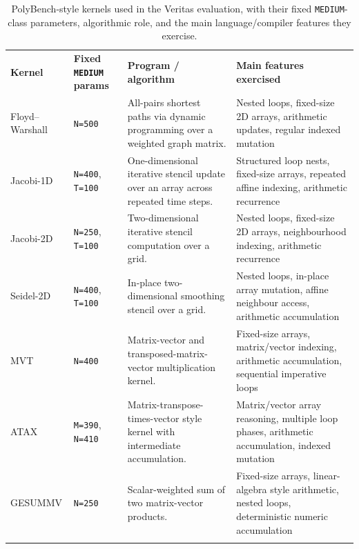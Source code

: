 \begin{table}[h]
  \centering
  \scriptsize
  \begin{tabular}{p{} p{} p{} p{}}
    \tablehline
    \textbf{Kernel} & \textbf{Fixed \texttt{MEDIUM} params} & \textbf{Program / algorithm}                                                       & \textbf{Main features exercised}                                                                     \\
    \tablehline
    Floyd--Warshall & \texttt{N=500}                        & All-pairs shortest paths via dynamic programming over a weighted graph matrix.     & Nested loops, fixed-size 2D arrays, arithmetic updates, regular indexed mutation                     \\
    Jacobi-1D       & \texttt{N=400}, \texttt{T=100}        & One-dimensional iterative stencil update over an array across repeated time steps. & Structured loop nests, fixed-size arrays, repeated affine indexing, arithmetic recurrence            \\
    Jacobi-2D       & \texttt{N=250}, \texttt{T=100}        & Two-dimensional iterative stencil computation over a grid.                         & Nested loops, fixed-size 2D arrays, neighbourhood indexing, arithmetic recurrence                    \\
    Seidel-2D       & \texttt{N=400}, \texttt{T=100}        & In-place two-dimensional smoothing stencil over a grid.                            & Nested loops, in-place array mutation, affine neighbour access, arithmetic accumulation              \\
    MVT             & \texttt{N=400}                        & Matrix-vector and transposed-matrix-vector multiplication kernel.                  & Fixed-size arrays, matrix/vector indexing, arithmetic accumulation, sequential imperative loops      \\
    ATAX            & \texttt{M=390}, \texttt{N=410}        & Matrix-transpose-times-vector style kernel with intermediate accumulation.         & Matrix/vector array reasoning, multiple loop phases, arithmetic accumulation, indexed mutation       \\
    GESUMMV         & \texttt{N=250}                        & Scalar-weighted sum of two matrix-vector products.                                 & Fixed-size arrays, linear-algebra style arithmetic, nested loops, deterministic numeric accumulation \\
    \tablehline
  \end{tabular}
  \caption{PolyBench-style kernels used in the Veritas evaluation, with their
    fixed \texttt{MEDIUM}-class parameters, algorithmic role, and the main
    language/compiler features they exercise.}
  \label{tab:polybench-kernels}
\end{table}

